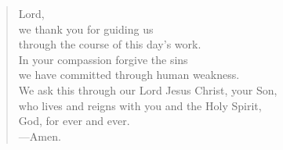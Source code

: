 \prayer

\setlength{\vleftmargin}{\prayerleftmargini}

\begin{verse}
Lord,\\
we thank you for guiding us\\
through the course of this day’s work.\\
In your compassion forgive the sins\\
we have committed through human weakness.\\
We ask this through our Lord Jesus Christ, your Son,\\
who lives and reigns with you and the Holy Spirit,\\
God, for ever and ever.\\
{\color{red}---\thinspace}Amen.
\end{verse}

\setlength{\vleftmargin}{\defleftmargini}